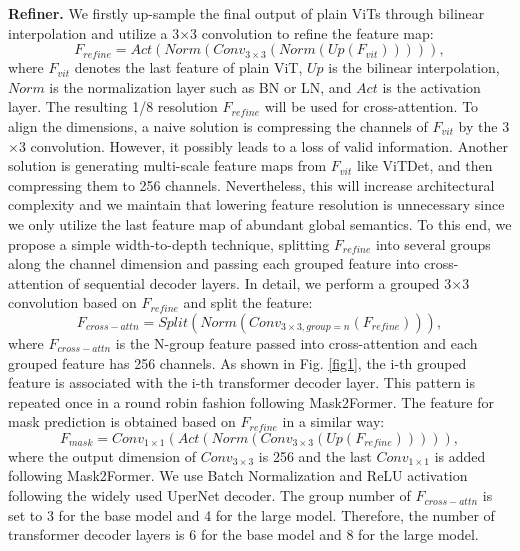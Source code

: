 \documentclass{article} \usepackage{iclr2024_conference,times}
\begin{document}
\textbf{Refiner.} We firstly up-sample the final output of plain ViTs through bilinear interpolation and utilize a 3$\times$3 convolution to refine the feature map:
\begin{equation}
F_{refine} = Act(Norm(Conv_{3\times3}(Norm(Up(F_{vit}))))),
\label{eq3}
\end{equation}
where $F_{vit}$ denotes the last feature of plain ViT, $Up$ is the bilinear interpolation, $Norm$ is the normalization layer such as BN or LN, and $Act$ is the activation layer.
The resulting 1/8 resolution $F_{refine}$ will be used for cross-attention. To align the dimensions, a naive solution is compressing the channels of $F_{vit}$ by the 3$\times$3 convolution. However, it possibly leads to a loss of valid information. Another solution is generating multi-scale feature maps from $F_{vit}$ like ViTDet, and then compressing them to 256 channels. Nevertheless, this will increase architectural complexity and we maintain that lowering feature resolution is unnecessary since we only utilize the last feature map of abundant global semantics. To this end, we propose a simple width-to-depth technique, splitting $F_{refine}$ into several groups along the channel dimension and passing each grouped feature into cross-attention of sequential decoder layers. In detail, we perform a grouped 3$\times$3 convolution based on $F_{refine}$ and split the feature:
\begin{equation}
F_{cross-attn} = Split(Norm(Conv_{3\times3, group=n}(F_{refine}))),
\label{eq4}
\end{equation}
where $F_{cross-attn}$ is the N-group feature passed into cross-attention and each grouped feature has 256 channels. As shown in Fig. \ref{fig1}, the i-th grouped feature is associated with the i-th transformer decoder layer. This pattern is repeated once in a round robin fashion following Mask2Former. The feature for mask prediction is obtained based on $F_{refine}$ in a similar way:
\begin{equation}
F_{mask} = Conv_{1\times1}(Act(Norm(Conv_{3\times3}(Up(F_{refine}))))),
\label{eq5}
\end{equation}
where the output dimension of $Conv_{3\times3}$ is 256 and the last $Conv_{1\times1}$ is added following Mask2Former. We use Batch Normalization and ReLU activation following the widely used UperNet decoder. The group number of $F_{cross-attn}$ is set to 3 for the base model and 4 for the large model. Therefore, the number of transformer decoder layers is 6 for the base model and 8 for the large model.
\end{document}
